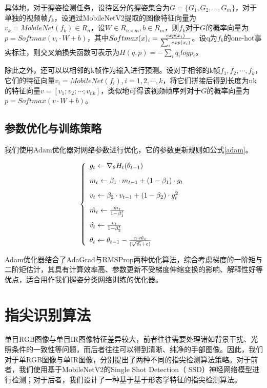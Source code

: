具体地，对于握姿检测任务，设待区分的握姿集合为$G=\{G_1,G_2,...,G_m\}$，对于单独的视频帧$f_k$，设通过MobileNetV2提取的图像特征向量为$v_k=MobileNet(f_k) \in R_{n}$，设$W \in R_{n \times m}, b \in R_{m}$，则$f_k$对于$G$的概率向量为$p = Softmax(v_i \cdot W + b)$，其中$Softmax(x)_i = {{exp(x_i)} \over {\sum_i exp(x_i)}}$。设q为$f_k$的one-hot事实标注，则交叉熵损失函数可表示为$H(q,p)=-\sum_i q_i logp_i$。

除此之外，还可以以相邻的k帧作为输入进行预测。设对于相邻的k帧$f_1,f_2,\cdots,f_k$，它们的特征向量$v_i=MobileNet(f_i),i=1,2,\cdots,k$，将它们拼接后得到长度为nk的特征向量$v=[v_1;v_2;\cdots;v_{nk}]$，类似地可得该视频帧序列对于$G$的概率向量为$p = Softmax(v \cdot W + b)$。

\subsection{参数优化与训练策略}

我们使用Adam优化器\cite{2014arXiv1412.6980K}对网络参数进行优化，它的参数更新规则如公式\ref{adam}。

\begin{equation}
\label{adam}
\left\{\begin{array}{l}
    g_t \leftarrow \nabla_\theta H_t(\theta_{t-1})\\[0.3cm]
    m_t \leftarrow \beta_1 \cdot m_{t-1} + (1-\beta_1) \cdot g_t\\[0.3cm]
    v_t \leftarrow \beta_2 \cdot v_{t-1} + (1-\beta_2) \cdot g_t^2\\[0.3cm]
    \hat{m_t} \leftarrow {m_t \over {1- \beta_1^t}}\\[0.3cm]
    \hat{v_t} \leftarrow {v_t \over {1- \beta_2^t}}\\[0.3cm]
    \theta_t \leftarrow \theta_{t-1} - {\alpha \cdot {\hat{m_t}} \over {(\sqrt{\hat{v_t}} + \epsilon)}}
\end{array}\right.
\end{equation}

Adam优化器结合了AdaGrad与RMSProp两种优化算法，综合考虑梯度的一阶矩与二阶矩估计，其具有计算效率高、参数更新不受梯度伸缩变换的影响、解释性好等优点，适合用作我们握姿分类网络训练的优化器。




\section{指尖识别算法}
\label{cha:fingertip}
单目RGB图像与单目IR图像特征差异较大，前者往往需要处理诸如背景干扰、光照条件的一致性等问题，而后者往往可以得到清晰、纯净的手部图像。因此，我们对于单RGB图像与单IR图像，分别提出了两种不同的指尖检测算法策略。对于前者，我们使用基于MobileNetV2的Single Shot Detection（
SSD）神经网络模型进行检测；对于后者，我们设计了一种基于基于形态学特征的指尖检测算法。

